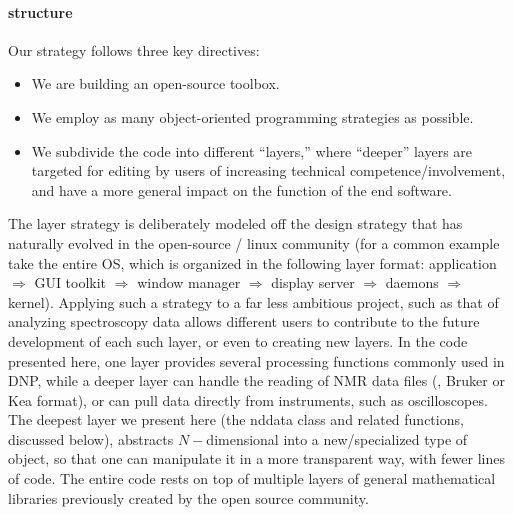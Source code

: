 \paragraph{structure}
Our strategy follows three key directives:
    \begin{itemize}
        \item We are building an open-source toolbox.
        \item We employ as many object-oriented programming strategies as possible.
        \item We subdivide the code into different ``layers,'' where ``deeper'' layers are targeted for editing by users of increasing technical competence/involvement, and have a more general impact on the function of the end software.
    \end{itemize}
The layer strategy is deliberately modeled off the
    design strategy that has naturally evolved
    in the open-source / linux community
    (for a common example
    take the entire OS, which is organized in the following layer format:
    application $\Rightarrow$ GUI toolkit $\Rightarrow$ window manager $\Rightarrow$ display server $\Rightarrow$ daemons $\Rightarrow$ kernel).
Applying such a strategy to a far less ambitious
    project, such as that of analyzing spectroscopy data
    allows different users to contribute to the future development
    of each such layer, or even to creating new layers.
In the code presented here,
    one layer provides several processing functions commonly used in DNP,
    while a deeper layer can handle the reading of NMR data files (\ie, Bruker or Kea format),
    or can pull data directly from instruments,
    such as oscilloscopes.
The deepest layer we present 
    here (the nddata class and related functions,
    discussed below),
    abstracts $N-$dimensional into 
    a new/specialized type of object,
    so that one can manipulate it in a more
    transparent way, with fewer lines of code.
The entire code rests on top of multiple layers
    of general mathematical libraries previously created by the open
    source community.

